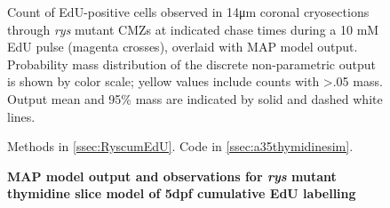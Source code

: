 \documentclass{ut-thesis}
\begin{document}
\begin{NoHyper}
\begin{figure}[!h]
    \caption{{\bf MAP model output and observations for \textit{rys} mutant thymidine slice model of 5dpf cumulative EdU labelling}}
    Count of EdU-positive cells observed in 14\si{\micro\metre} coronal cryosections through \textit{rys} mutant CMZs at indicated chase times during a 10 mM EdU pulse (magenta crosses), overlaid with MAP model output. Probability mass distribution of the discrete non-parametric output is shown by color scale; yellow values include counts with >.05 mass. Output mean and 95\% mass are indicated by solid and dashed white lines.

    Methods in \autoref{ssec:RyscumEdU}. Code in \autoref{ssec:a35thymidinesim}.
    \label{a35rysMAP}
\end{figure}


\end{NoHyper}
\end{document}
